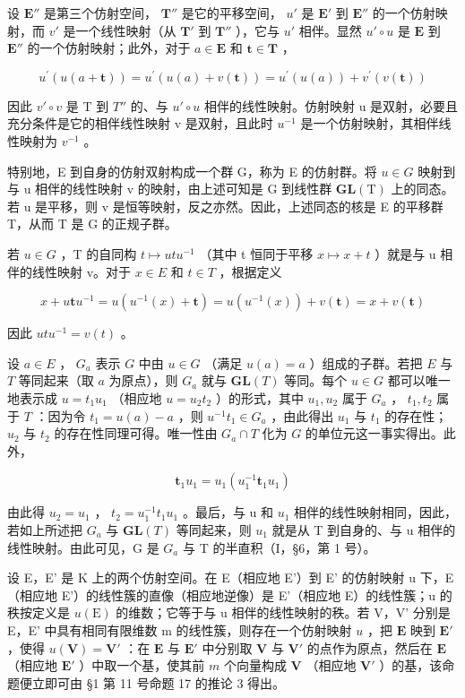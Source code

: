 设 \(\mathbf{E}''\) 是第三个仿射空间， \(\mathbf{T}''\) 是它的平移空间， \(u'\) 是 \(\mathbf{E}'\) 到 \(\mathbf{E}''\) 的一个仿射映射，而 \(v'\) 是一个线性映射（从 \(\mathbf{T}'\) 到 \(\mathbf{T}''\) ），它与 \(u'\) 相伴。显然 \(u' \circ u\) 是 \(\mathbf{E}\) 到 \(\mathbf{E}''\) 的一个仿射映射；此外，对于 \(a \in \mathbf{E}\) 和 \(\mathbf{t} \in \mathbf{T}\) ，

\[
u ^ {\prime} (u (a + \mathbf {t})) = u ^ {\prime} (u (a) + v (\mathbf {t})) = u ^ {\prime} (u (a)) + v ^ {\prime} (v (\mathbf {t}))
\]

因此 \(v'\circ v\) 是 T 到 \(T''\) 的、与 \(u'\circ u\) 相伴的线性映射。仿射映射 u 是双射，必要且充分条件是它的相伴线性映射 v 是双射，且此时 \(u^{-1}\) 是一个仿射映射，其相伴线性映射为 \(v^{-1}\) 。

特别地，E 到自身的仿射双射构成一个群 G，称为 E 的仿射群。将 \(u \in G\) 映射到与 u 相伴的线性映射 v 的映射，由上述可知是 G 到线性群 \(\mathbf{GL}(\mathrm{T})\) 上的同态。若 u 是平移，则 v 是恒等映射，反之亦然。因此，上述同态的核是 E 的平移群 T，从而 T 是 G 的正规子群。

若 \(u \in G\) ，T 的自同构 \(t \mapsto utu^{-1}\) （其中 t 恒同于平移 \(x \mapsto x + t\) ）就是与 u 相伴的线性映射 v。对于 \(x \in E\) 和 \(t \in T\) ，根据定义

\[
x + u \mathbf {t} u ^ {- 1} = u (u ^ {- 1} (x) + \mathbf {t}) = u (u ^ {- 1} (x)) + v (\mathbf {t}) = x + v (\mathbf {t})
\]

因此 \(utu^{-1} = v(t)\) 。

设 \(a \in E\) ， \(G_a\) 表示 \(G\) 中由 \(u \in G\) （满足 \(u(a) = a\) ）组成的子群。若把 \(E\) 与 \(T\) 等同起来（取 \(a\) 为原点），则 \(G_a\) 就与 \(\mathbf{GL}(T)\) 等同。每个 \(u \in G\) 都可以唯一地表示成 \(u = t_1 u_1\) （相应地 \(u = u_2 t_2\) ）的形式，其中 \(u_1, u_2\) 属于 \(G_a\) ， \(t_1, t_2\) 属于 \(T\) ：因为令 \(t_1 = u(a) - a\) ，则 \(u^{-1} t_1 \in G_a\) ，由此得出 \(u_1\) 与 \(t_1\) 的存在性； \(u_2\) 与 \(t_2\) 的存在性同理可得。唯一性由 \(G_a \cap T\) 化为 \(G\) 的单位元这一事实得出。此外，

\[
\mathbf {t} _ {1} u _ {1} = u _ {1} (u _ {1} ^ {- 1} \mathbf {t} _ {1} u _ {1})
\]

由此得 \(u_{2}=u_{1}\) ， \(t_{2}=u_{1}^{-1}t_{1}u_{1}\) 。最后，与 u 和 \(u_{1}\) 相伴的线性映射相同，因此，若如上所述把 \(G_{a}\) 与 \(\mathbf{GL}(T)\) 等同起来，则 \(u_{1}\) 就是从 T 到自身的、与 u 相伴的线性映射。由此可见，G 是 \(G_{a}\) 与 T 的半直积（I，§6，第 1 号）。

设 E，E' 是 K 上的两个仿射空间。在 E（相应地 E'）到 E' 的仿射映射 u 下，E（相应地 E'）的线性簇的直像（相应地逆像）是 E'（相应地 E）的线性簇；u 的秩按定义是 \(u(\mathrm{E})\) 的维数；它等于与 u 相伴的线性映射的秩。若 V，V' 分别是 E，E' 中具有相同有限维数 m 的线性簇，则存在一个仿射映射 \(u\) ，把 \(\mathbf{E}\) 映到 \(\mathbf{E}'\) ，使得 \(u(\mathbf{V}) = \mathbf{V}'\) ：在 \(\mathbf{E}\) 与 \(\mathbf{E}'\) 中分别取 \(\mathbf{V}\) 与 \(\mathbf{V}'\) 的点作为原点，然后在 \(\mathbf{E}\) （相应地 \(\mathbf{E}'\) ）中取一个基，使其前 \(m\) 个向量构成 \(\mathbf{V}\) （相应地 \(\mathbf{V}'\) ）的基，该命题便立即可由 §1 第 11 号命题 17 的推论 3 得出。

